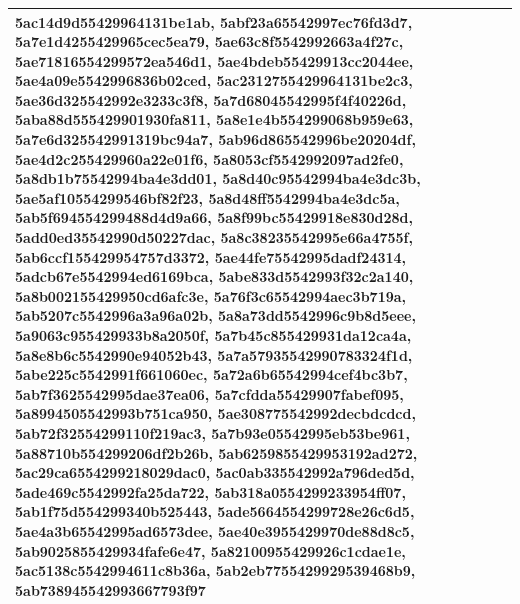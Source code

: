 \documentclass{article} %
\begin{document}
\begin{table}[h!]
\begin{tabular}{|p{12cm}|}
5ac14d9d55429964131be1ab, 5abf23a65542997ec76fd3d7, 5a7e1d4255429965cec5ea79, 5ae63c8f5542992663a4f27c, 5ae71816554299572ea546d1, 5ae4bdeb55429913cc2044ee, 5ae4a09e5542996836b02ced, 5ac2312755429964131be2c3, 5ae36d325542992e3233c3f8, 5a7d68045542995f4f40226d, 5aba88d555429901930fa811, 5a8e1e4b554299068b959e63, 5a7e6d325542991319bc94a7, 5ab96d865542996be20204df, 5ae4d2c255429960a22e01f6, 5a8053cf5542992097ad2fe0, 5a8db1b75542994ba4e3dd01, 5a8d40c95542994ba4e3dc3b, 5ae5af10554299546bf82f23, 5a8d48ff5542994ba4e3dc5a, 5ab5f694554299488d4d9a66, 5a8f99bc55429918e830d28d, 5add0ed35542990d50227dac, 5a8c38235542995e66a4755f, 5ab6ccf155429954757d3372, 5ae44fe75542995dadf24314, 5adcb67e5542994ed6169bca, 5abe833d5542993f32c2a140, 5a8b002155429950cd6afc3e, 5a76f3c65542994aec3b719a, 5ab5207c5542996a3a96a02b, 5a8a73dd5542996c9b8d5eee, 5a9063c955429933b8a2050f, 5a7b45c855429931da12ca4a, 5a8e8b6c5542990e94052b43, 5a7a57935542990783324f1d, 5abe225c5542991f661060ec, 5a72a6b65542994cef4bc3b7, 5ab7f3625542995dae37ea06, 5a7cfdda55429907fabef095, 5a8994505542993b751ca950, 5ae308775542992decbdcdcd, 5ab72f32554299110f219ac3, 5a7b93e05542995eb53be961, 5a88710b554299206df2b26b, 5ab6259855429953192ad272, 5ac29ca6554299218029dac0, 5ac0ab335542992a796ded5d, 5ade469c5542992fa25da722, 5ab318a0554299233954ff07, 5ab1f75d554299340b525443, 5ade5664554299728e26c6d5, 5ae4a3b65542995ad6573dee, 5ae40e3955429970de88d8c5, 5ab9025855429934fafe6e47, 5a82100955429926c1cdae1e, 5ac5138c5542994611c8b36a, 5ab2eb7755429929539468b9, 5ab738945542993667793f97 \\
\bottomrule
    \end{tabular}
\end{table}
\end{document}
